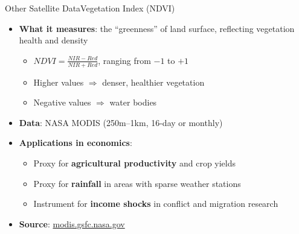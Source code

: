 \documentclass[hyperref={pdfpagelabels=false}]{beamer}
\begin{document}
\begin{frame}{Other Satellite Data}{Vegetation Index (NDVI)}
\begin{itemize}
    \item \textbf{What it measures}: the ``greenness'' of land surface,
    reflecting vegetation health and density
    \vspace{0.2cm}
    \begin{itemize}
        \item $NDVI = \frac{NIR - Red}{NIR + Red}$, ranging from $-1$ to $+1$
        \vspace{0.1cm}
        \item Higher values $\Rightarrow$ denser, healthier vegetation
        \vspace{0.1cm}
        \item Negative values $\Rightarrow$ water bodies
    \end{itemize}
    \vspace{0.2cm}
    \item \textbf{Data}: NASA MODIS (250m--1km, 16-day or monthly)
    \vspace{0.2cm}
    \item \textbf{Applications in economics}:
    \vspace{0.1cm}
    \begin{itemize}
        \item Proxy for \textbf{agricultural productivity} and crop yields
        \vspace{0.1cm}
        \item Proxy for \textbf{rainfall} in areas with sparse weather stations
        \vspace{0.1cm}
        \item Instrument for \textbf{income shocks} in conflict and migration research
    \end{itemize}
    \vspace{0.2cm}
    \item \textbf{Source}: 
    \href{https://modis.gsfc.nasa.gov/data/dataprod/mod13.php}{modis.gsfc.nasa.gov}
\end{itemize}
\end{frame}
\end{document}

